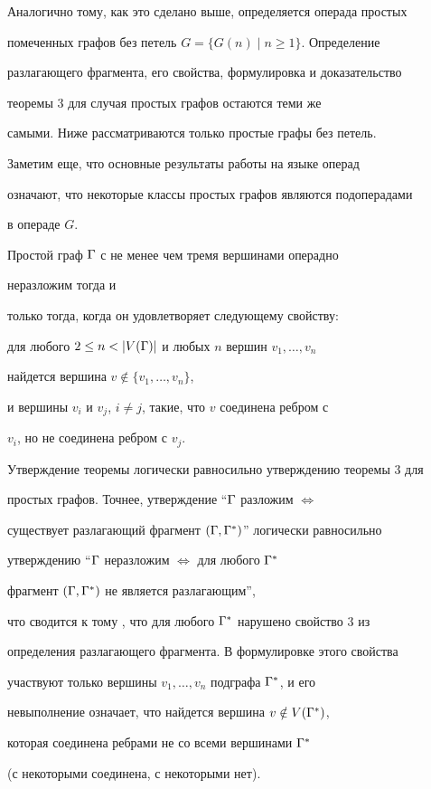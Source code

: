 Аналогично тому, как это сделано выше, определяется операда простых 


помеченных графов без петель $G=\{ G(n) \mid n\geq 1\} $. Определение 


разлагающего фрагмента, его свойства, формулировка и доказательство 


теоремы 3 для случая простых графов остаются теми же 


самыми. Ниже рассматриваются только простые графы без петель.


Заметим еще, что основные результаты работы \cite{LM} на языке операд


означают, что некоторые классы простых графов являются подоперадами


в операде $G$.





\begin{thm} 


Простой граф ${\Gamma}$ с не менее чем тремя вершинами операдно 


неразложим тогда и 


только тогда, когда он удовлетворяет следующему свойству\/${:}$


для любого $2\leq n< | V({\Gamma}) |$ и любых $n$ вершин $v_1,\dotsc , v_n$ 


найдется вершина $v\notin \{ v_1,\dotsc , v_n\}$, 


и вершины $v_i$ и $v_j$, $i\neq j$, такие, что $v$ соединена ребром с


$v_i$, но не соединена ребром с $v_j$.


\end{thm}





\begin{pf}


Утверждение теоремы логически равносильно утверждению теоремы 3 для 


простых графов. Точнее, утверждение ``${\Gamma}$ разложим $\Leftrightarrow$ 


существует разлагающий фрагмент $({\Gamma}, {\Gamma}^*)$'' логически равносильно 


утверждению ``${\Gamma}$ неразложим $\Leftrightarrow$ для любого ${\Gamma}^*$ 


фрагмент $({\Gamma}, {\Gamma}^*)$ не является разлагающим'', 


что сводится к тому , что для любого ${\Gamma}^*$ нарушено свойство 3 из 


определения разлагающего фрагмента. В формулировке этого свойства 


участвуют только вершины $v_1,\dotsc , v_n$ подграфа ${\Gamma}^*$, и его 


невыполнение означает, что найдется вершина $v\notin V({\Gamma}^*)$, 


которая соединена ребрами не со всеми вершинами ${\Gamma}^*$


(с некоторыми соединена, с некоторыми нет).


\end{pf}






